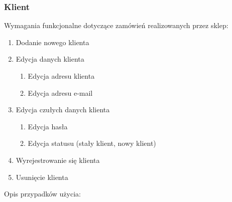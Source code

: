 \subsubsection{Klient}

Wymagania funkcjonalne dotyczące zamówień realizowanych przez sklep:

\begin{enumerate}
  \item Dodanie nowego klienta
  \item Edycja danych klienta
  \begin{enumerate}
    \item Edycja adresu klienta
    \item Edycja adresu e-mail
  \end{enumerate}
  \item Edycja czułych danych klienta
  \begin{enumerate}
    \item Edycja hasła
    \item Edycja statusu (stały klient, nowy klient)
  \end{enumerate}
  \item Wyrejestrowanie się klienta
  \item Usunięcie klienta
\end{enumerate}

Opis przypadków użycia: